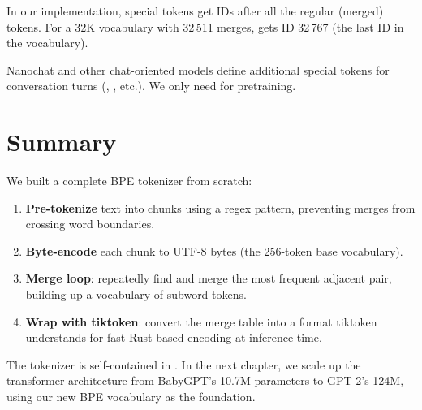 In our implementation, special tokens get IDs after all the regular (merged) tokens.  For a 32K vocabulary with 32\,511 merges,  gets ID 32\,767 (the last ID in the vocabulary).

Nanochat and other chat-oriented models define additional special tokens for conversation turns (, , etc.).  We only need  for pretraining.


\section{Summary}

We built a complete BPE tokenizer from scratch:

\begin{enumerate}
  \item \textbf{Pre-tokenize} text into chunks using a regex pattern, preventing merges from crossing word boundaries.
  \item \textbf{Byte-encode} each chunk to UTF-8 bytes (the 256-token base vocabulary).
  \item \textbf{Merge loop}: repeatedly find and merge the most frequent adjacent pair, building up a vocabulary of subword tokens.
  \item \textbf{Wrap with tiktoken}: convert the merge table into a format tiktoken understands for fast Rust-based encoding at inference time.
\end{enumerate}

The tokenizer is self-contained in .  In the next chapter, we scale up the transformer architecture from BabyGPT's 10.7M parameters to GPT-2's 124M, using our new BPE vocabulary as the foundation.
